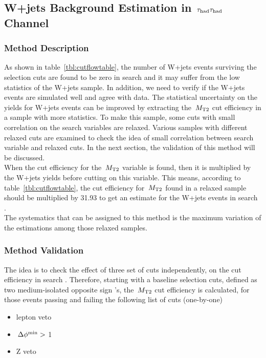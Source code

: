 \subsection{\texorpdfstring{W+jets Background Estimation in $\,\tau_{\rm had}\tau_{\rm had}$ Channel}{W+jets Background Estimation in tau-tau Channel}}
\subsubsection{Method Description}
As shown in table~\ref{tbl:cutflowtable}, the number of W+jets events surviving 
the selection cuts are found to be zero in search \binone and it may suffer from the low statistics of the W+jets sample. In addition, we need to verify if the W+jets events are simulated well and agree with data.
 The statistical uncertainty on the yields for W+jets events can be improved by extracting 
the $\,{M_{\rm T2}}$ cut efficiency in a sample with more statistics. To make this sample, some cuts with small correlation on the search variables are 
relaxed. Various samples with different relaxed cuts are examined to check the idea of small correlation 
between search variable and relaxed cuts. In the next section, the validation of this method will be discussed.\\
When the cut efficiency for the $\,{M_{\rm T2}}$ variable is found, then it is multiplied by the W+jets 
yields before cutting on this variable. This means, according to table~\ref{tbl:cutflowtable}, the cut efficiency for 
$\,{M_{\rm T2}}$ found in a relaxed sample should be multiplied by 31.93 to get an 
estimate for the W+jets events in search \binone.\\
The systematics that can be assigned to this method is the maximum
variation of the estimations among those relaxed samples.
\subsubsection{Method Validation}
The idea is to check the effect of three set of cuts independently, 
on the \mttwo cut efficiency in search \binone. 
Therefore, starting with a baseline selection cuts, defined as two 
medium-isolated opposite sign \Tau's, the $\,{M_{\rm T2}}$ cut 
efficiency is calculated, for those events passing and failing the following list of cuts (one-by-one)
\begin{itemize}
\item lepton veto
\item $\,{\Delta\phi^{\rm min}}>$ 1
\item Z veto 
\end{itemize}

